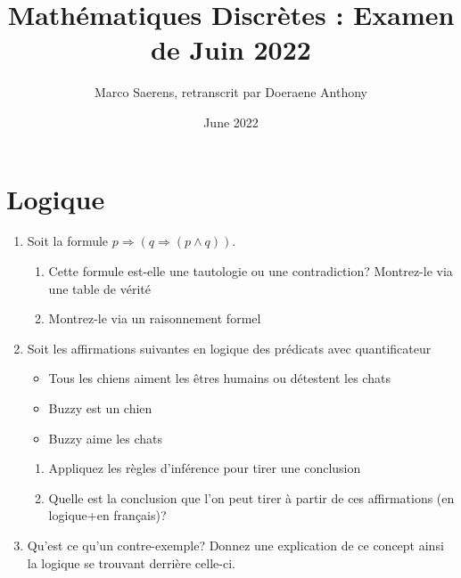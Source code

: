 \documentclass[A4paper,11pt]{article}
\title{Mathématiques Discrètes : Examen de Juin 2022}
\author{Marco Saerens, retranscrit par Doeraene Anthony}
\date{June 2022}
\begin{document}
\maketitle

\section{Logique}
\begin{enumerate}
    \item Soit la formule $p\Rightarrow (q\Rightarrow (p\land q))$. 
    \begin{enumerate}
        \item Cette formule est-elle une tautologie ou une contradiction? Montrez-le via une table de vérité
        \item Montrez-le via un raisonnement formel
    \end{enumerate}
    
    \item Soit les affirmations suivantes en logique des prédicats avec quantificateur
    \begin{itemize}
        \item Tous les chiens aiment les êtres humains ou détestent les chats
        \item Buzzy est un chien
        \item Buzzy aime les chats
    \end{itemize}
    \begin{enumerate}
        \item Appliquez les règles d'inférence pour tirer une conclusion
        \item Quelle est la conclusion que l'on peut tirer à partir de ces affirmations (en logique+en français)?
    \end{enumerate}
    \item Qu'est ce qu'un contre-exemple? Donnez une explication de ce concept ainsi la logique se trouvant derrière celle-ci.
\end{enumerate}
\end{document}
